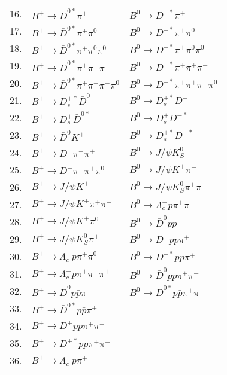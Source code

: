 \begin{tabular}{|l|l|l|}
    16.&$B^{+} \rightarrow \bar{D}^{0 *} \pi^{+}$                       &     $B^{0} \rightarrow D^{-*} \pi^{+}$\\
    17.&$B^{+} \rightarrow \bar{D}^{0 *} \pi^{+} \pi^{0}$               &     $B^{0} \rightarrow D^{-*} \pi^{+} \pi^{0}$\\
    18.&$B^{+} \rightarrow \bar{D}^{0 *} \pi^{+} \pi^{0} \pi^{0}$       &     $B^{0} \rightarrow D^{-*} \pi^{+} \pi^{0} \pi^{0}$\\
    19.&$B^{+} \rightarrow \bar{D}^{0 *} \pi^{+} \pi^{+} \pi^{-}$       &     $B^{0} \rightarrow D^{-*} \pi^{+} \pi^{+} \pi^{-}$\\
    20.&$B^{+} \rightarrow \bar{D}^{0 *} \pi^{+} \pi^{+} \pi^{-} \pi^{0}$&     $B^{0} \rightarrow D^{-*} \pi^{+} \pi^{+} \pi^{-} \pi^{0}$\\
    21.&$B^{+} \rightarrow D_{s}^{+*} \bar{D}^{0}$                      &     $B^{0} \rightarrow D_{s}^{+*} D^{-}$\\
    22.&$B^{+} \rightarrow D_{s}^{+} \bar{D}^{0 *}$                     &     $B^{0} \rightarrow D_{s}^{+} D^{-*}$\\
    23.&$B^{+} \rightarrow \bar{D}^{0} K^{+}$                           &     $B^{0} \rightarrow D_{s}^{+*} D^{-*}$\\
    24.&$B^{+} \rightarrow D^{-} \pi^{+} \pi^{+}$                       &     $B^{0} \rightarrow J / \psi K_{S}^{0}$\\
    25.&$B^{+} \rightarrow D^{-} \pi^{+} \pi^{+} \pi^{0}$               &      $B^{0} \rightarrow J / \psi K^{+} \pi^{-}$\\
    26.&$B^{+} \rightarrow J / \psi K^{+}$                              &    $B^{0} \rightarrow J / \psi K_{S}^{0} \pi^{+} \pi^{-}$\\
    27.&$B^{+} \rightarrow J / \psi K^{+} \pi^{+} \pi^{-}$              &     $B^{0} \rightarrow \Lambda_{c}^{-} p \pi^{+} \pi^{-}$\\
    28.&$B^{+} \rightarrow J / \psi K^{+} \pi^{0}$                      &     $B^{0} \rightarrow \bar{D}^{0} p \bar{p}$\\
    29.&$B^{+} \rightarrow J / \psi K_{S}^{0} \pi^{+}$                  &     $B^{0} \rightarrow D^{-} p \bar{p} \pi^{+}$\\
    30.&$B^{+} \rightarrow \Lambda_{c}^{-} p \pi^{+} \pi^{0}$           &     $B^{0} \rightarrow D^{-*} p \bar{p} \pi^{+}$\\
    31.&$B^{+} \rightarrow \Lambda_{c}^{-} p \pi^{+} \pi^{-} \pi^{+}$   &     $B^{0} \rightarrow \bar{D}^{0} p \bar{p} \pi^{+} \pi^{-}$\\
    32.&$B^{+} \rightarrow \bar{D}^{0} p \bar{p} \pi^{+}$               &     $B^{0} \rightarrow \bar{D}^{0 *} p \bar{p} \pi^{+} \pi^{-}$\\
    33.&$B^{+} \rightarrow \bar{D}^{0 *} p \bar{p} \pi^{+}$             &     \\
    34.&$B^{+} \rightarrow D^{+} p \bar{p} \pi^{+} \pi^{-}$             & \\
    35.&$B^{+} \rightarrow D^{+*} p \bar{p} \pi^{+} \pi^{-}$            & \\ 
    36.& $B^{+} \rightarrow \Lambda_{c}^{-} p \pi^{+}$                   & \\
    \hline
\end{tabular}